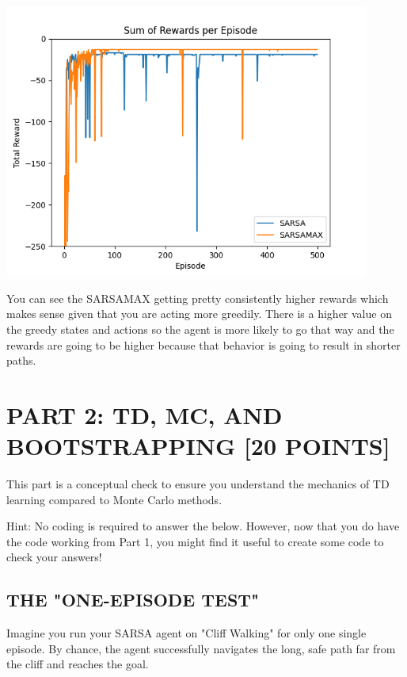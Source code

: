 \documentclass{article}
\begin{document}
\begin{itemize}
    \includegraphics[width=0.9\textwidth]{rewardsComparison.png}
    
    You can see the SARSAMAX getting pretty consistently higher rewards which makes sense given that you are acting more greedily.
    There is a higher value on the greedy states and actions so the agent is more likely to go that way and the rewards are going to be higher because that behavior is going to result in shorter paths.

\end{itemize}

\section{PART 2: TD, MC, AND BOOTSTRAPPING [20 POINTS]}

This part is a conceptual check to ensure you understand the mechanics of TD learning compared to Monte Carlo methods.

Hint: No coding is required to answer the below. However, now that you do have the code working from Part 1, you might find it useful to create some code to check your answers!

\subsection{THE "ONE-EPISODE TEST"}

Imagine you run your SARSA agent on "Cliff Walking" for only one single episode. By chance, the agent successfully navigates the long, safe path far from the cliff and reaches the goal.
\end{document}
